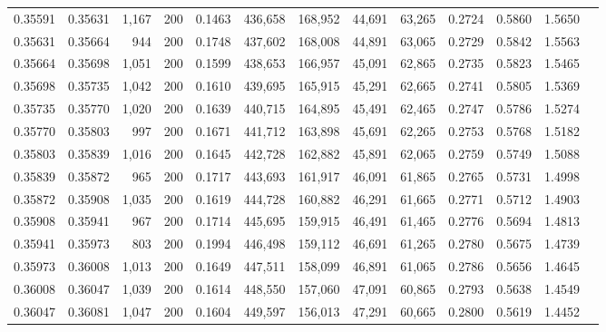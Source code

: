 \begin{tabular}{rrrrrrrrrrrrr}
0.35591 & 0.35631 & 1,167 & 200 &                                     0.1463 & 436,658 & 168,952 &  44,691 &  63,265 & 0.2724 & 0.5860 & 1.5650 \\
0.35631 & 0.35664 &   944 & 200 &                                     0.1748 & 437,602 & 168,008 &  44,891 &  63,065 & 0.2729 & 0.5842 & 1.5563 \\
0.35664 & 0.35698 & 1,051 & 200 &                                     0.1599 & 438,653 & 166,957 &  45,091 &  62,865 & 0.2735 & 0.5823 & 1.5465 \\
0.35698 & 0.35735 & 1,042 & 200 &                                     0.1610 & 439,695 & 165,915 &  45,291 &  62,665 & 0.2741 & 0.5805 & 1.5369 \\
0.35735 & 0.35770 & 1,020 & 200 &                                     0.1639 & 440,715 & 164,895 &  45,491 &  62,465 & 0.2747 & 0.5786 & 1.5274 \\
0.35770 & 0.35803 &   997 & 200 &                                     0.1671 & 441,712 & 163,898 &  45,691 &  62,265 & 0.2753 & 0.5768 & 1.5182 \\
0.35803 & 0.35839 & 1,016 & 200 &                                     0.1645 & 442,728 & 162,882 &  45,891 &  62,065 & 0.2759 & 0.5749 & 1.5088 \\
0.35839 & 0.35872 &   965 & 200 &                                     0.1717 & 443,693 & 161,917 &  46,091 &  61,865 & 0.2765 & 0.5731 & 1.4998 \\
0.35872 & 0.35908 & 1,035 & 200 &                                     0.1619 & 444,728 & 160,882 &  46,291 &  61,665 & 0.2771 & 0.5712 & 1.4903 \\
0.35908 & 0.35941 &   967 & 200 &                                     0.1714 & 445,695 & 159,915 &  46,491 &  61,465 & 0.2776 & 0.5694 & 1.4813 \\
0.35941 & 0.35973 &   803 & 200 &                                     0.1994 & 446,498 & 159,112 &  46,691 &  61,265 & 0.2780 & 0.5675 & 1.4739 \\
0.35973 & 0.36008 & 1,013 & 200 &                                     0.1649 & 447,511 & 158,099 &  46,891 &  61,065 & 0.2786 & 0.5656 & 1.4645 \\
0.36008 & 0.36047 & 1,039 & 200 &                                     0.1614 & 448,550 & 157,060 &  47,091 &  60,865 & 0.2793 & 0.5638 & 1.4549 \\
0.36047 & 0.36081 & 1,047 & 200 &                                     0.1604 & 449,597 & 156,013 &  47,291 &  60,665 & 0.2800 & 0.5619 & 1.4452 \\

\end{tabular}
